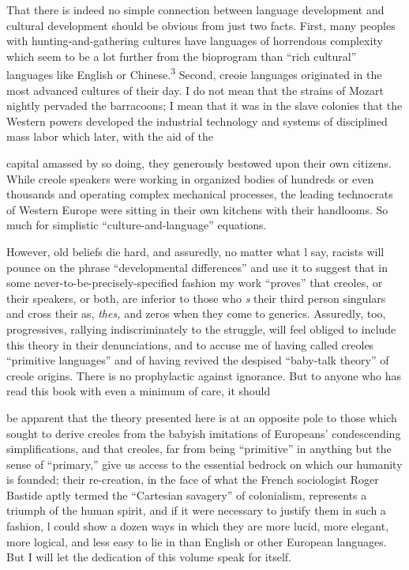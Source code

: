 That there is indeed no simple connection between language development and cultural development should be obvious from just two facts. First, many peoples with hunting-and-gathering cultures have languages of horrendous complexity which seem to be a lot further from the bioprogram than ``rich cultural'' languages like English or Chinese.\textsuperscript{3} Second, creoie languages originated in the most advanced cultures of their day. I do not mean that the strains of Mozart nightly pervaded the barracoons; I mean that it was in the slave colonies that the Western powers developed the industrial technology and systems of disciplined mass labor which later, with the aid of the

capital amassed by so doing, they generously bestowed upon their own citizens. While creole speakers were working in organized bodies of hundreds or even thousands and operating complex mechanical processes, the leading technocrats of Western Europe were sitting in their own kitchens with their handlooms. So much for simplistic ``culture-and-language'' equations.


However, old beliefs die hard, and assuredly, no matter what l say, racists will pounce on the phrase ``developmental differences'' and use it to suggest that in some never-to-be-precisely-specified fashion my work ``proves'' that creoles, or their speakers, or both, are inferior to those who \textit{s} their third person singulars and cross their as, \textit{thes,} and zeros when they come to generics. Assuredly, too, progressives, rallying indiscriminately to the struggle, will feel obliged to include this theory in their denunciations, and to accuse me of having called creoles ``primi\-tive languages'' and of having revived the despised ``baby-talk theory'' of creole origins. There is no prophylactic against ignorance. But to anyone who has read this book with even a minimum of care, it should

be apparent that the theory presented here is at an opposite pole to those which sought to derive creoles from the babyish imitations of Europeans' condescending simplifications, and that creoles, far from being ``primitive'' in anything but the sense of ``primary,'' give us access to the essential bedrock on which our humanity is founded; their re-creation, in the face of what the French sociologist Roger Bastide aptly termed the ``Cartesian savagery'' of colonialism, repre\-sents a triumph of the human spirit, and if it were necessary to justify them in such a fashion, l could show a dozen ways in which they are more lucid, more elegant, more logical, and less easy to lie in than English or other European languages. But I will let the dedication of this volume speak for itself.


